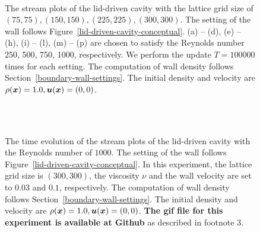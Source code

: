 \begin{figure}[t]
\begin{center}
{    }\\
    \caption{The stream plots of the lid-driven cavity
    with the lattice grid size of $(75, 75), (150, 150), (225, 225), (300, 300)$.
    The setting of the wall follows Figure~\ref{lid-driven-cavity-conceptual}.
    (a) -- (d), (e) -- (h), (i) -- (l), (m) -- (p) are chosen to satisfy the Reynolds number
    250, 500, 750, 1000, respectively.
    We perform the update $T = 100000$ times for each setting.
    The computation of wall density follows Section~\ref{boundary-wall-settings}.
    The initial density and velocity are $\rho(\boldsymbol{x}) = 1.0, \boldsymbol{u}(\boldsymbol{x}) = (0, 0)$.
      \label{fig:sliding-lid-reynolds-comparison}}
  \end{center}
\end{figure}

\begin{figure}[t]
  \begin{center}
    \\
    \vspace{-3mm}
    \\
    \caption{
      The time evolution of the stream plots of the lid-driven cavity
    with the Reynolds number of $1000$.
    The setting of the wall follows Figure~\ref{lid-driven-cavity-conceptual}.
    In this experiment, the lattice grid size is $(300, 300)$,
    the viscosity $\nu$ and the wall velocity are set to $0.03$ and $0.1$, respectively.
    The computation of wall density follows Section~\ref{boundary-wall-settings}.
    The initial density and velocity are $\rho(\boldsymbol{x}) = 1.0, \boldsymbol{u}(\boldsymbol{x}) = (0, 0)$.
    {\bf The gif file for this experiment is available at Github} as described in footnote 3.
    }
    \label{fig:sliding-lid-velocity-evolution}
  \end{center}
\end{figure}

